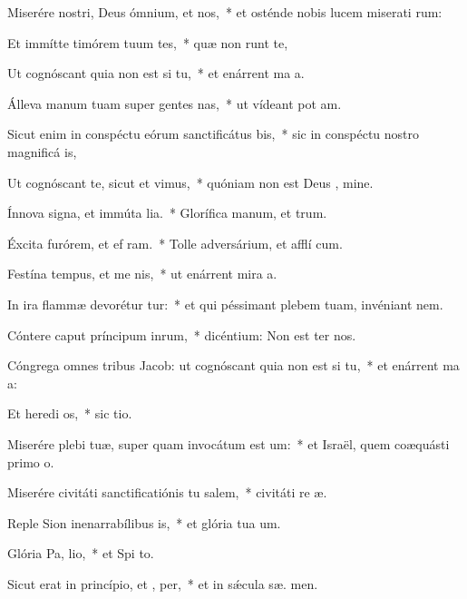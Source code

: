 \item Miserére nostri, Deus ómnium, et  nos,~* et osténde nobis lucem miserati rum:
\item Et immítte timórem tuum  tes,~* quæ non runt te,
\item Ut cognóscant quia non est  si tu,~* et enárrent ma a.
\item Álleva manum tuam super gentes nas,~* ut vídeant pot am.
\item Sicut enim in conspéctu eórum sanctificátus   bis,~* sic in conspéctu nostro magnificá  is,
\item Ut cognóscant te, sicut et  vimus,~* quóniam non est Deus  , mine.
\item Ínnova signa, et immúta lia.~* Glorífica manum, et  trum.
\item Éxcita furórem, et ef ram.~* Tolle adversárium, et afflí cum.
\item Festína tempus, et me nis,~* ut enárrent mira a.
\item In ira flammæ devorétur  tur:~* et qui péssimant plebem tuam, invéniant nem.
\item Cóntere caput príncipum inrum,~* dicéntium: Non est  ter nos.
\item Cóngrega omnes tribus Jacob: ut cognóscant quia non est  si tu,~* et enárrent ma a:
\item Et heredi os,~* sic  tio.
\item Miserére plebi tuæ, super quam invocátum est  um:~* et Israël, quem coæquásti primo o.
\item Miserére civitáti sanctificatiónis tu salem,~* civitáti re æ.
\item Reple Sion inenarrabílibus  is,~* et glória tua  um.
\item Glória Pa,  lio,~* et Spi to.
\item Sicut erat in princípio, et ,  per,~* et in sǽcula sæ. men.
